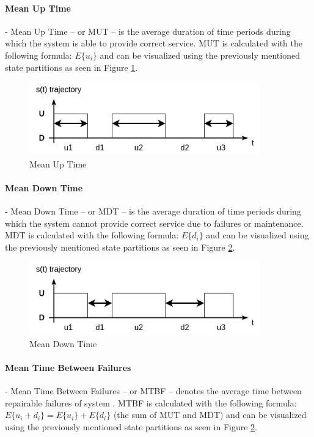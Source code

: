 \paragraph{Mean Up Time} - Mean Up Time -- or MUT -- is the average duration of time periods during which the system is able to provide correct service. MUT is calculated with the following formula: \(E\{u_i\}\) and can be visualized using the previously mentioned state partitions as seen in Figure \ref{fig:mut}.

\begin{figure}[h]
	\centering
	\includegraphics[width=100mm, keepaspectratio]{figures/MUT.png}
	\caption{ Mean Up Time \cite{DependabilityBMEMIT} }
	\label{fig:mut}
\end{figure}

\paragraph{Mean Down Time} - Mean Down Time -- or MDT -- is the average duration of time periods during which the system cannot provide correct service due to failures or maintenance. MDT is calculated with the following formula: \(E\{d_i\}\) and can be visualized using the previously mentioned state partitions as seen in Figure \ref{fig:mdt}.

\begin{figure}[h]
	\centering
	\includegraphics[width=100mm, keepaspectratio]{figures/MDT.png}
	\caption{ Mean Down Time \cite{DependabilityBMEMIT} }
	\label{fig:mdt}
\end{figure}

\paragraph{Mean Time Between Failures} - Mean Time Between Failures -- or MTBF -- denotes the average time between repairable failures of system \cite{KPIMetrics}. MTBF is calculated with the following formula: \(E\{u_i + d_i\} = E\{u_i\} + E\{d_i\}\) (the sum of MUT and MDT) and can be visualized using the previously mentioned state partitions as seen in Figure \ref{fig:mdt}.


